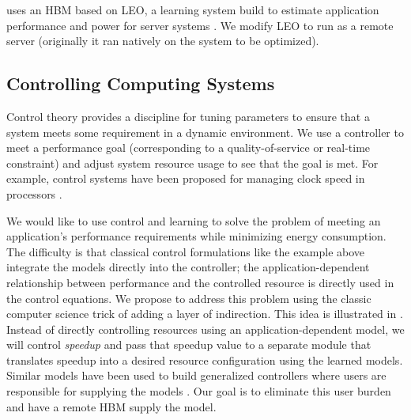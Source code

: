


\SYSTEM{} uses an HBM based on LEO, a learning system build to
estimate application performance and power for server systems
\cite{LEO}.  We modify LEO to run as a remote server (originally it
ran natively on the system to be optimized). 





\subsection{Controlling Computing Systems}

Control theory provides a discipline for tuning parameters to ensure
that a system meets some requirement in a dynamic environment.  We use
a controller to meet a performance goal (corresponding to a
quality-of-service or real-time constraint) and adjust system resource
usage to see that the goal is met.  For example, control systems have
been proposed for managing clock speed in processors \cite{lefurgy}.


We would like to use control and learning to solve the problem of
meeting an application's performance requirements while minimizing
energy consumption.  The difficulty is that classical control
formulations like the example above integrate the models directly into
the controller; \ie the application-dependent relationship between
performance and the controlled resource is directly used in the
control equations.  We propose to address this problem using the
classic computer science trick of adding a layer of indirection.  This
idea is illustrated in .  Instead of directly
controlling resources using an application-dependent model, we will
control \emph{speedup} and pass that speedup value to a separate
module that translates speedup into a desired resource configuration
using the learned models.  Similar models have been used to build
generalized controllers where users are responsible for supplying the
models \cite{POET}.  Our goal is to eliminate this user burden and
have a remote HBM supply the model.


